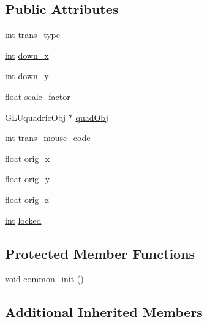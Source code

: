\subsection*{Public Attributes}
\begin{DoxyCompactItemize}
\item 
\hyperlink{wglext_8h_a500a82aecba06f4550f6849b8099ca21}{int} \hyperlink{class_g_l_u_i___translation_a77dc15982b9c636e04d8bc815507e119}{trans\+\_\+type}
\item 
\hyperlink{wglext_8h_a500a82aecba06f4550f6849b8099ca21}{int} \hyperlink{class_g_l_u_i___translation_aa46419b2ae882df046ddd5025316280d}{down\+\_\+x}
\item 
\hyperlink{wglext_8h_a500a82aecba06f4550f6849b8099ca21}{int} \hyperlink{class_g_l_u_i___translation_ab78f19f2db9ca8c72f38492872b46600}{down\+\_\+y}
\item 
float \hyperlink{class_g_l_u_i___translation_af90186734b22e53b38be362d40f79bed}{scale\+\_\+factor}
\item 
G\+L\+Uquadric\+Obj $\ast$ \hyperlink{class_g_l_u_i___translation_a8c70c62612841d36e7c7a85393f90790}{quad\+Obj}
\item 
\hyperlink{wglext_8h_a500a82aecba06f4550f6849b8099ca21}{int} \hyperlink{class_g_l_u_i___translation_a64a9c96e7cd81d9bac3254190439a0ad}{trans\+\_\+mouse\+\_\+code}
\item 
float \hyperlink{class_g_l_u_i___translation_a112ad0d95aef6ccd325d228225313926}{orig\+\_\+x}
\item 
float \hyperlink{class_g_l_u_i___translation_aaa8ec31a5c1590a52366731b1e2bf372}{orig\+\_\+y}
\item 
float \hyperlink{class_g_l_u_i___translation_abfdf3200eb1bb7523ca2806f30836c18}{orig\+\_\+z}
\item 
\hyperlink{wglext_8h_a500a82aecba06f4550f6849b8099ca21}{int} \hyperlink{class_g_l_u_i___translation_ae473787c0b8f2154b2def41bf01f89b6}{locked}
\end{DoxyCompactItemize}
\subsection*{Protected Member Functions}
\begin{DoxyCompactItemize}
\item 
\hyperlink{wglext_8h_a9e6b7f1933461ef318bb000d6bd13b83}{void} \hyperlink{class_g_l_u_i___translation_a7d4b489591ce3aa9670da935bdc0cbbe}{common\+\_\+init} ()
\end{DoxyCompactItemize}
\subsection*{Additional Inherited Members}


